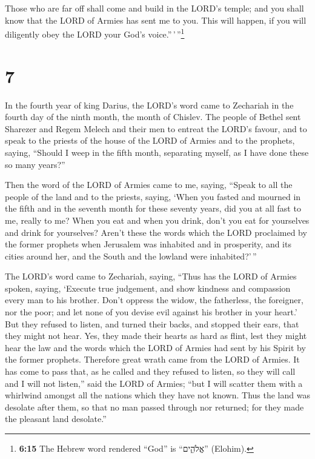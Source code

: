  Those who are far off shall come and build in the LORD's
temple; and you shall know that the LORD of Armies has sent me to you.
This will happen, if you will diligently obey the LORD your God's
voice.''\,'\,''\footnote{\textbf{6:15} The Hebrew word rendered ``God''
  is ``אֱלֹהִ֑ים'' (Elohim).}

\hypertarget{section-6}{%
\section{7}\label{section-6}}

 In the fourth year of king Darius, the LORD's word came
to Zechariah in the fourth day of the ninth month, the month of Chislev.
 The people of Bethel sent Sharezer and Regem Melech and
their men to entreat the LORD's favour,  and to speak to
the priests of the house of the LORD of Armies and to the prophets,
saying, ``Should I weep in the fifth month, separating myself, as I have
done these so many years?''

 Then the word of the LORD of Armies came to me, saying,
 ``Speak to all the people of the land and to the priests,
saying, `When you fasted and mourned in the fifth and in the seventh
month for these seventy years, did you at all fast to me, really to me?
 When you eat and when you drink, don't you eat for
yourselves and drink for yourselves?  Aren't these the
words which the LORD proclaimed by the former prophets when Jerusalem
was inhabited and in prosperity, and its cities around her, and the
South and the lowland were inhabited?'\,''

 The LORD's word came to Zechariah, saying, 
``Thus has the LORD of Armies spoken, saying, `Execute true judgement,
and show kindness and compassion every man to his brother.
 Don't oppress the widow, the fatherless, the foreigner,
nor the poor; and let none of you devise evil against his brother in
your heart.'  But they refused to listen, and turned
their backs, and stopped their ears, that they might not hear.
 Yes, they made their hearts as hard as flint, lest they
might hear the law and the words which the LORD of Armies had sent by
his Spirit by the former prophets. Therefore great wrath came from the
LORD of Armies.  It has come to pass that, as he called
and they refused to listen, so they will call and I will not listen,''
said the LORD of Armies;  ``but I will scatter them with
a whirlwind amongst all the nations which they have not known. Thus the
land was desolate after them, so that no man passed through nor
returned; for they made the pleasant land desolate.''

